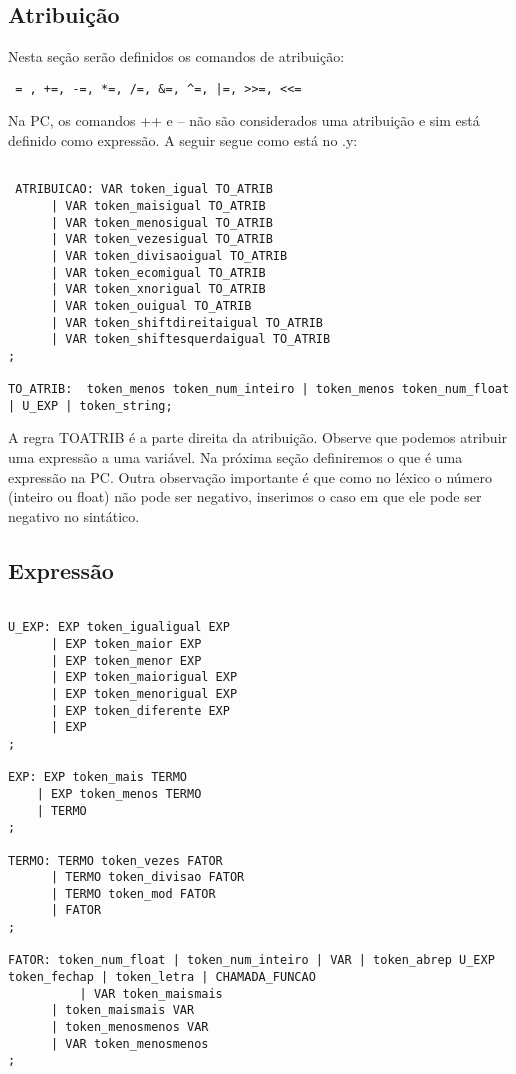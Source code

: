 \documentclass[a4paper,10pt]{article}
\begin{document}
\subsection{Atribuição}

Nesta seção serão definidos os comandos de atribuição:

\begin{verbatim}
 = , +=, -=, *=, /=, &=, ^=, |=, >>=, <<=
\end{verbatim}

Na PC, os comandos ++ e -- não são considerados uma atribuição e sim está definido como expressão. A seguir segue como está no .y:

\begin{verbatim}

 ATRIBUICAO: VAR token_igual TO_ATRIB
	  | VAR token_maisigual TO_ATRIB
	  | VAR token_menosigual TO_ATRIB
	  | VAR token_vezesigual TO_ATRIB
	  | VAR token_divisaoigual TO_ATRIB
	  | VAR token_ecomigual TO_ATRIB
	  | VAR token_xnorigual TO_ATRIB
	  | VAR token_ouigual TO_ATRIB
	  | VAR token_shiftdireitaigual TO_ATRIB
	  | VAR token_shiftesquerdaigual TO_ATRIB
;

TO_ATRIB:  token_menos token_num_inteiro | token_menos token_num_float | U_EXP | token_string;

\end{verbatim}

A regra TOATRIB é a parte direita da atribuição. Observe que podemos atribuir uma expressão a uma variável. Na próxima seção definiremos o que é uma expressão na PC.
Outra observação importante é que como no léxico o número (inteiro ou float) não pode ser negativo, inserimos o caso em que ele pode ser negativo no sintático.

\subsection{Expressão}
\begin{verbatim}

U_EXP: EXP token_igualigual EXP
      | EXP token_maior EXP
      | EXP token_menor EXP
      | EXP token_maiorigual EXP
      | EXP token_menorigual EXP
      | EXP token_diferente EXP
      | EXP
;

EXP: EXP token_mais TERMO
    | EXP token_menos TERMO
    | TERMO
;

TERMO: TERMO token_vezes FATOR
      | TERMO token_divisao FATOR
      | TERMO token_mod FATOR
      | FATOR
;

FATOR: token_num_float | token_num_inteiro | VAR | token_abrep U_EXP token_fechap | token_letra | CHAMADA_FUNCAO
      	  | VAR token_maismais
	  | token_maismais VAR
	  | token_menosmenos VAR
	  | VAR token_menosmenos
;
\end{verbatim}
\end{document}
